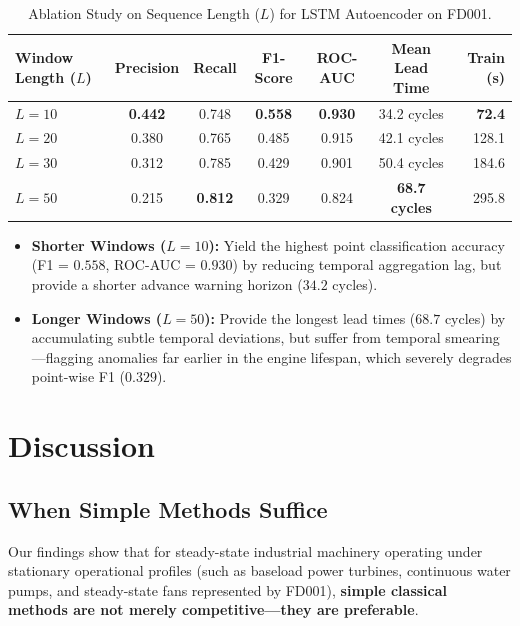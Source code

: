 \documentclass[12pt,a4paper,oneside]{report}
\begin{document}
\begin{table}[htbp]
    \centering
    \caption{Ablation Study on Sequence Length ($L$) for LSTM Autoencoder on FD001.}
    \label{tab:seq_len_ablation}
    \begin{tabular}{lcccccr}
        \toprule
        \textbf{Window Length ($L$)} & \textbf{Precision} & \textbf{Recall} & \textbf{F1-Score} & \textbf{ROC-AUC} & \textbf{Mean Lead Time} & \textbf{Train (s)} \\
        \midrule
        \textbf{$L = 10$} & \textbf{0.442} & 0.748 & \textbf{0.558} & \textbf{0.930} & 34.2 cycles & \textbf{72.4} \\
        \textbf{$L = 20$} & 0.380 & 0.765 & 0.485 & 0.915 & 42.1 cycles & 128.1 \\
        \textbf{$L = 30$} & 0.312 & 0.785 & 0.429 & 0.901 & 50.4 cycles & 184.6 \\
        \textbf{$L = 50$} & 0.215 & \textbf{0.812} & 0.329 & 0.824 & \textbf{68.7 cycles} & 295.8 \\
        \bottomrule
    \end{tabular}
\end{table}

\begin{itemize}
    \item \textbf{Shorter Windows ($L = 10$):} Yield the highest point classification accuracy (F1 = $0.558$, ROC-AUC = $0.930$) by reducing temporal aggregation lag, but provide a shorter advance warning horizon ($34.2$ cycles).
    \item \textbf{Longer Windows ($L = 50$):} Provide the longest lead times ($68.7$ cycles) by accumulating subtle temporal deviations, but suffer from temporal smearing—flagging anomalies far earlier in the engine lifespan, which severely degrades point-wise F1 ($0.329$).
\end{itemize}

\chapter{Discussion}

\section{When Simple Methods Suffice}
Our findings show that for steady-state industrial machinery operating under stationary operational profiles (such as baseload power turbines, continuous water pumps, and steady-state fans represented by FD001), \textbf{simple classical methods are not merely competitive—they are preferable}. 
\end{document}
